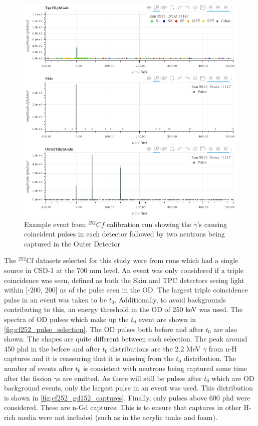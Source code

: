 \begin{figure}[]
\includegraphics[width=\textwidth]{Figures/NeutronCaptureTime/cf252_eventviewer_5916.png}
\centering
\caption{Example event from ${}^{252}{Cf}$ calibration run showing the $\gamma$'s causing coincident pulses in each detector followed by two neutrons being captured in the Outer Detector}
\label{fig:cf252_event_viewer}
\end{figure}

\par
The ${}^{252}$Cf datasets selected for this study were from runs which had a single source in CSD-1 at the 700 mm level.
An event was only considered if a triple coincidence was seen, defined as both the Skin and TPC detectors seeing light within [-200, 200] ns of the pulse seen in the OD.
The largest triple coincidence pulse in an event was taken to be $t_0$.
Additionally, to avoid backgrounds contributing to this, an energy threshold in the OD of 250 keV was used.
The spectra of OD pulses which make up the $t_0$ event are shown in \autoref{fig:cf252_pulse_selection}.
The OD pulses both before and after $t_0$ are also shown.
The shapes are quite different between each selection.
The peak around 450 phd in the before and after $t_0$ distributions are the 2.2 MeV $\gamma$ from n-H captures and it is reassuring that it is missing from the $t_0$ distribution.
The number of events after $t_0$ is consistent with neutrons being captured some time after the fission $\gamma$s are emitted.
As there will still be pulses after $t_0$ which are OD background events, only the largest pulse in an event was used.
This distribution is shown in \autoref{fig:cf252_gd152_captures}.
Finally, only pulses above 600 phd were considered.
These are n-Gd captures.
This is to ensure that captures in other H-rich media were not included (such as in the acrylic tanks and foam).

